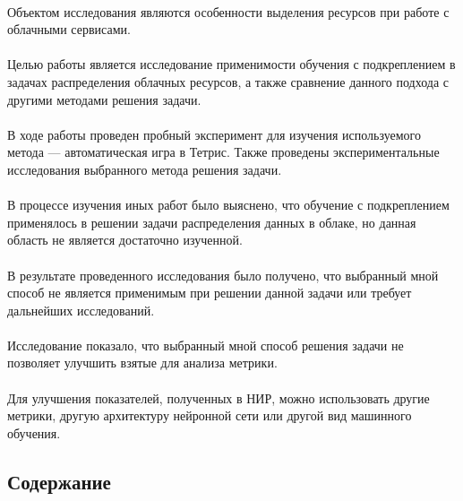 \documentclass[draft]{article}
\begin{document}
~\\
Объектом исследования являются особенности выделения ресурсов при работе с облачными сервисами.\\
~\\
Целью работы является исследование применимости обучения с подкреплением в задачах распределения облачных ресурсов, а также сравнение данного подхода с другими методами решения задачи. \\
~\\
В ходе работы проведен пробный эксперимент для изучения используемого метода — автоматическая игра в Тетрис. Также проведены экспериментальные исследования выбранного метода решения задачи.\\
~\\
В процессе изучения иных работ было выяснено, что обучение с подкреплением применялось в решении задачи распределения данных в облаке, но данная область не является достаточно изученной.\\
~\\
В результате проведенного исследования было получено, что выбранный мной способ не является применимым при решении данной задачи или требует дальнейших исследований.\\
~\\
Исследование показало, что выбранный мной способ решения задачи не позволяет улучшить взятые для анализа метрики.\\
~\\
Для улучшения показателей, полученных в НИР, можно использовать другие метрики, другую архитектуру нейронной сети или другой вид машинного обучения.
\newpage
\begin{center}
\section {Содержание}
\tableofcontents
\end{center}
\newpage
\end{document}
